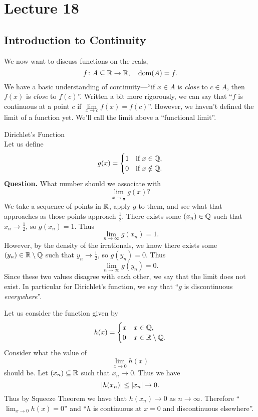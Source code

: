 \documentclass[class=article, crop=false]{standalone}
\begin{document}
  \section{Lecture 18}
  \subsection{Introduction to Continuity}
  We now want to discuss functions on the reals,
  \[
    f\colon A\subseteq \mathbb{R}\to \mathbb{R}, \quad\operatorname{dom}(A) = f.
  \]
  We have a basic understanding of continuity---``if $x\in A$ is \emph{close} to $c\in A$, then $f(x)$ is \emph{close} to $f(c)$''. Written a bit more rigorously, we can say that ``$f$ is continuous at a point $c$ if $\lim\limits_{x\to c} f(x) = f(c)$''. However, we haven't defined the limit of a function yet. We'll call the limit above a ``functional limit''.
  \begin{example}{Dirichlet's Function} \\
    Let us define
    \[
      g(x) = \begin{cases}
        1 & \text{if }x\in \mathbb{Q}, \\
        0 & \text{if }x\notin \mathbb{Q}.
      \end{cases}
    \]
    \textbf{Question.} What number should we associate with
    \[
      \lim_{x\to \frac{1}{2}} g(x)?
    \]
    We take a sequence of points in $\mathbb{R}$, apply $g$ to them, and see what that approaches as those points approach $\frac{1}{2}$. There exists some $(x_n)\in\mathbb{Q}$ such that $x_n\to \frac{1}{2}$, so $g(x_n) = 1$. Thus
    \[
      \lim_{n\to \infty} g(x_n) = 1.
    \]
    However, by the density of the irrationals, we know there exists some $(y_n)\in \mathbb{R}\setminus\mathbb{Q}$ such that $y_n\to \frac{1}{2}$, so $g(y_n) = 0$. Thus
    \[
      \lim_{n\to \infty} g(y_n) = 0.
    \]
    Since these two values disagree with each other, we say that the limit does not exist. In particular for Dirichlet's function, we say that ``$g$ is discontinuous \emph{everywhere}''.
  \end{example}
  \begin{example}{}
    Let us consider the function given by
    \[
      h(x) = \begin{cases}
        x & x\in\mathbb{Q}, \\
        0 & x\in\mathbb{R}\setminus\mathbb{Q}.
      \end{cases}
    \]
    Consider what the value of
    \[
      \lim_{x\to 0} h(x)
    \]
    should be. Let $(x_n)\subseteq\mathbb{R}$ such that $x_n\to 0$. Thus we have
    \[
      \left\lvert h(x_n) \right\rvert \leq \left\lvert x_n \right\rvert \to 0.
    \]
    Thus by Squeeze Theorem we have that $h(x_n)\to 0$ as $n\to\infty$. Therefore
    ``$\displaystyle \lim_{x\to 0} h(x) = 0$'' and ``$h$ is continuous at $x = 0$ and discontinuous elsewhere''.
  \end{example}
\end{document}
